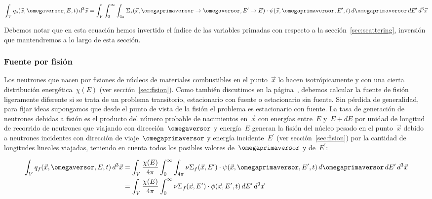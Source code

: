 \begin{equation}
\label{eq:qs}
\int_V
q_s(\vec{x}, \omegaversor, E, t)
\, d^3\vec{x} = 
\int_V
 \int_{0}^{\infty} \int_{4\pi} \Sigma_s(\vec{x}, \omegaprimaversor  \rightarrow \omegaversor, E^\prime \rightarrow E) \cdot \psi(\vec{x}, \omegaprimaversor, E^\prime, t) \, d\omegaprimaversor \, dE^\prime
\, d^3\vec{x}
\end{equation}

Debemos notar que en esta ecuación hemos invertido el índice de las variables primadas con respecto a la sección~\ref{sec:scattering}, inversión que mantendremos a lo largo de esta sección.

\subsubsection{Fuente por fisión} %

Los neutrones que nacen por fisiones de núcleos de materiales combustibles en el punto~$\vec{x}$ lo hacen isotrópicamente y con una cierta distribución energética~$\chi(E)$ (ver sección~\ref{sec:fision}). Como también discutimos en la página~\pageref{sec:fision}, debemos calcular la fuente de fisión ligeramente diferente si se trata de un problema transitorio, estacionario con fuente o estacionario sin fuente. Sin pérdida de generalidad, para fijar ideas supongamos que desde el punto de vista de la fisión el problema es estacionario con fuente. La tasa de generación de neutrones debidas a fisión es el producto del número probable de nacimientos en~$\vec{x}$ con energías entre~$E$ y~$E+dE$ por unidad de longitud de recorrido de neutrones que viajando con dirección~$\omegaversor$ y energía~$E$ generan la fisión del núcleo pesado en el punto~$\vec{x}$ debido a neutrones incidentes con dirección de viaje~$\omegaprimaversor$ y energía incidente~$E^\prime$ (ver sección~\ref{sec:fision}) por la cantidad de longitudes lineales viajadas, teniendo en cuenta todos los posibles valores de~$\omegaprimaversor$ y de~$E^\prime$:

\begin{align}\label{eq:qf}
\int_V
q_f(\vec{x}, \omegaversor, E, t)
\, d^3\vec{x} &= 
\int_V
\frac{\chi(E)}{4\pi} \int_{0}^{\infty} \int_{4\pi} \nu\Sigma_f(\vec{x}, E^\prime) \cdot \psi(\vec{x}, \omegaprimaversor, E^\prime, t) \, d\omegaprimaversor \, dE^\prime
\, d^3\vec{x} \nonumber \\
 &= 
\int_V
\frac{\chi(E)}{4\pi} \int_{0}^{\infty} \nu\Sigma_f(\vec{x}, E^\prime) \cdot \phi(\vec{x}, E^\prime, t) \, dE^\prime
\, d^3\vec{x}
\end{align}

